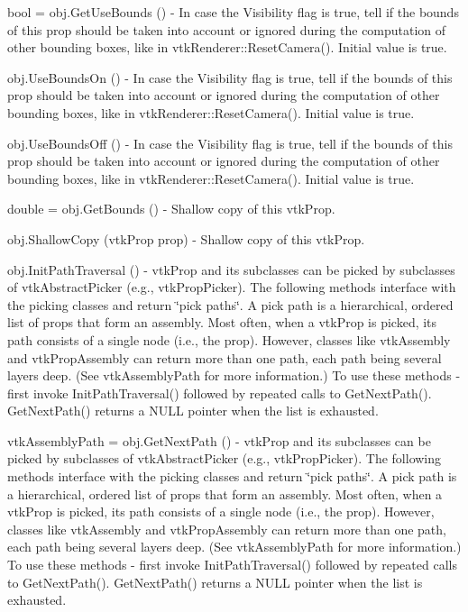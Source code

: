 \begin{DoxyItemize}
\item {\ttfamily bool = obj.\-Get\-Use\-Bounds ()} -\/ In case the Visibility flag is true, tell if the bounds of this prop should be taken into account or ignored during the computation of other bounding boxes, like in vtk\-Renderer\-::\-Reset\-Camera(). Initial value is true.  
\item {\ttfamily obj.\-Use\-Bounds\-On ()} -\/ In case the Visibility flag is true, tell if the bounds of this prop should be taken into account or ignored during the computation of other bounding boxes, like in vtk\-Renderer\-::\-Reset\-Camera(). Initial value is true.  
\item {\ttfamily obj.\-Use\-Bounds\-Off ()} -\/ In case the Visibility flag is true, tell if the bounds of this prop should be taken into account or ignored during the computation of other bounding boxes, like in vtk\-Renderer\-::\-Reset\-Camera(). Initial value is true.  
\item {\ttfamily double = obj.\-Get\-Bounds ()} -\/ Shallow copy of this vtk\-Prop.  
\item {\ttfamily obj.\-Shallow\-Copy (vtk\-Prop prop)} -\/ Shallow copy of this vtk\-Prop.  
\item {\ttfamily obj.\-Init\-Path\-Traversal ()} -\/ vtk\-Prop and its subclasses can be picked by subclasses of vtk\-Abstract\-Picker (e.\-g., vtk\-Prop\-Picker). The following methods interface with the picking classes and return \char`\"{}pick paths\char`\"{}. A pick path is a hierarchical, ordered list of props that form an assembly. Most often, when a vtk\-Prop is picked, its path consists of a single node (i.\-e., the prop). However, classes like vtk\-Assembly and vtk\-Prop\-Assembly can return more than one path, each path being several layers deep. (See vtk\-Assembly\-Path for more information.) To use these methods -\/ first invoke Init\-Path\-Traversal() followed by repeated calls to Get\-Next\-Path(). Get\-Next\-Path() returns a N\-U\-L\-L pointer when the list is exhausted.  
\item {\ttfamily vtk\-Assembly\-Path = obj.\-Get\-Next\-Path ()} -\/ vtk\-Prop and its subclasses can be picked by subclasses of vtk\-Abstract\-Picker (e.\-g., vtk\-Prop\-Picker). The following methods interface with the picking classes and return \char`\"{}pick paths\char`\"{}. A pick path is a hierarchical, ordered list of props that form an assembly. Most often, when a vtk\-Prop is picked, its path consists of a single node (i.\-e., the prop). However, classes like vtk\-Assembly and vtk\-Prop\-Assembly can return more than one path, each path being several layers deep. (See vtk\-Assembly\-Path for more information.) To use these methods -\/ first invoke Init\-Path\-Traversal() followed by repeated calls to Get\-Next\-Path(). Get\-Next\-Path() returns a N\-U\-L\-L pointer when the list is exhausted.  

\end{DoxyItemize}
